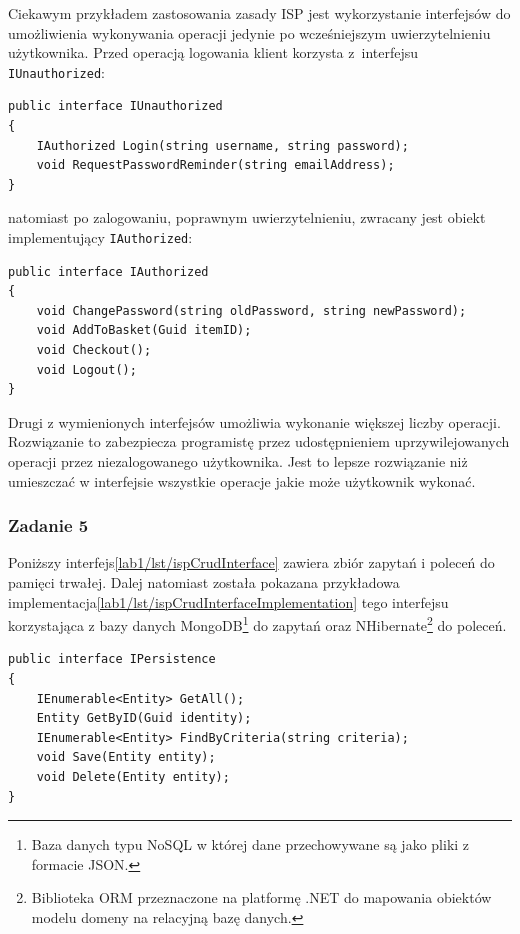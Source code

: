 Ciekawym przykładem zastosowania zasady ISP jest wykorzystanie interfejsów do umożliwienia wykonywania operacji jedynie po wcześniejszym uwierzytelnieniu użytkownika. Przed operacją logowania klient korzysta z~interfejsu \texttt{IUnauthorized}:
\begin{lstlisting}
public interface IUnauthorized
{
	IAuthorized Login(string username, string password);
	void RequestPasswordReminder(string emailAddress);
}
\end{lstlisting}
natomiast po zalogowaniu, poprawnym uwierzytelnieniu, zwracany jest obiekt implementujący \texttt{IAuthorized}:
\begin{lstlisting}
public interface IAuthorized
{
	void ChangePassword(string oldPassword, string newPassword);
	void AddToBasket(Guid itemID);
	void Checkout();
	void Logout();
}
\end{lstlisting}
Drugi z wymienionych interfejsów umożliwia wykonanie większej liczby operacji. Rozwiązanie to zabezpiecza programistę przez udostępnieniem uprzywilejowanych operacji przez niezalogowanego użytkownika. Jest to lepsze rozwiązanie niż umieszczać w interfejsie wszystkie operacje jakie może użytkownik wykonać. 

\subsubsection{Zadanie 5}
Poniższy interfejs\ref{lab1/lst/ispCrudInterface} zawiera zbiór zapytań i poleceń do pamięci trwałej. Dalej natomiast została pokazana przykładowa implementacja\ref{lab1/lst/ispCrudInterfaceImplementation} tego interfejsu korzystająca z bazy danych MongoDB\footnote{Baza danych typu NoSQL w której dane przechowywane są jako pliki z formacie JSON.} do zapytań oraz NHibernate\footnote{Biblioteka ORM przeznaczone na platformę .NET do mapowania obiektów modelu domeny na relacyjną bazę danych.} do poleceń.
\begin{lstlisting}[caption={Interfejs zawierający zbiór operacji CRUD}, label={lab1/lst/ispCrudInterface}]
public interface IPersistence
{
	IEnumerable<Entity> GetAll();
	Entity GetByID(Guid identity);
	IEnumerable<Entity> FindByCriteria(string criteria);
	void Save(Entity entity);
	void Delete(Entity entity);
}
\end{lstlisting}

